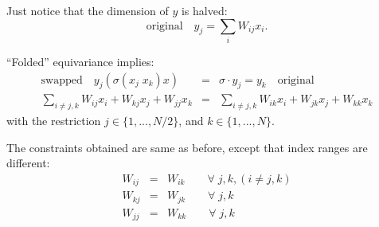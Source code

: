 Just notice that the dimension of $y$ is halved:
\begin{equation}
\boxed{\mbox{original}} \quad y_j = \sum_i W_{ij} x_i .
\end{equation}

``Folded'' equivariance implies:
\begin{eqnarray}
\boxed{\mbox{swapped}} \quad y_j ( \sigma(x_j \; x_k) x) %
&=& \sigma \cdot y_j = y_k \quad \boxed{\mbox{original}} \\
\sum_{i \neq j,k} W_{ij} x_i + W_{kj} x_j + W_{jj} x_k &=& \sum_{i \neq j,k} W_{ik} x_i + W_{jk} x_j + W_{kk} x_k  \nonumber
\end{eqnarray}
with the restriction $j \in \{ 1,..., N/2 \}$, and $k \in \{ 1,..., N \}$.

The constraints obtained are same as before, except that index ranges are different:
\begin{eqnarray}
W_{ij} &=& W_{ik} \quad \quad \forall \;  j, k, (i \neq j, k) \nonumber \\
W_{kj} &=& W_{jk} \quad \quad \forall \;  j, k \nonumber \\
W_{jj} &=& W_{kk} \quad \quad \forall \;  j, k \nonumber
\end{eqnarray}

